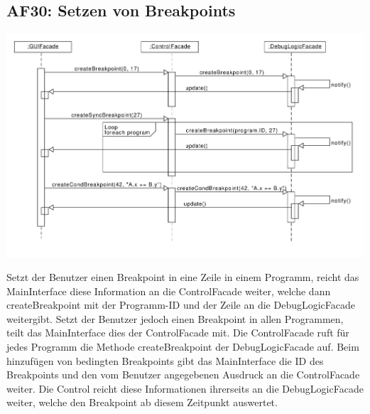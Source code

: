 \documentclass[parskip=full]{scrartcl}
\begin{document}
\subsection{AF30: Setzen von Breakpoints}
\begin{center}
\includegraphics[width=1.0\textwidth]{diagrammIdeenUmlet/SequenceDiagrams/seq_breakpointsPDF.pdf}
\end{center}
Setzt der Benutzer einen Breakpoint in eine Zeile in einem Programm, reicht das MainInterface
diese Information an die ControlFacade weiter, welche dann createBreakpoint mit der Programm-ID und der
Zeile an die DebugLogicFacade weitergibt.
Setzt der Benutzer jedoch einen Breakpoint in allen Programmen, teilt das
MainInterface dies der ControlFacade mit. Die ControlFacade ruft für jedes Programm
die Methode createBreakpoint der DebugLogicFacade auf.
Beim hinzufügen von bedingten Breakpoints gibt das MainInterface die ID des Breakpoints
und den vom Benutzer angegebenen Ausdruck an die ControlFacade weiter. Die Control reicht diese Informationen
ihrerseits an die DebugLogicFacade weiter, welche den Breakpoint ab diesem Zeitpunkt auswertet.

\newpage
\end{document}

